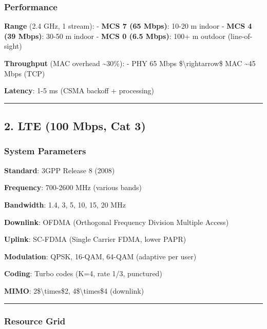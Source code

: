 \subsubsection{Performance}\label{performance}

\textbf{Range} (2.4 GHz, 1 stream): - \textbf{MCS 7 (65 Mbps)}: 10-20 m
indoor - \textbf{MCS 4 (39 Mbps)}: 30-50 m indoor - \textbf{MCS 0 (6.5
Mbps)}: 100+ m outdoor (line-of-sight)

\textbf{Throughput} (MAC overhead \textasciitilde30\%): - PHY 65 Mbps
\$\textbackslash rightarrow\$ MAC \textasciitilde45 Mbps (TCP)

\textbf{Latency}: 1-5 ms (CSMA backoff + processing)

\begin{center}\rule{0.5\linewidth}{0.5pt}\end{center}

\subsection{2. LTE (100 Mbps, Cat 3)}\label{lte-100-mbps-cat-3}

\subsubsection{System Parameters}\label{system-parameters-1}

\textbf{Standard}: 3GPP Release 8 (2008)

\textbf{Frequency}: 700-2600 MHz (various bands)

\textbf{Bandwidth}: 1.4, 3, 5, 10, 15, 20 MHz

\textbf{Downlink}: OFDMA (Orthogonal Frequency Division Multiple Access)

\textbf{Uplink}: SC-FDMA (Single Carrier FDMA, lower PAPR)

\textbf{Modulation}: QPSK, 16-QAM, 64-QAM (adaptive per user)

\textbf{Coding}: Turbo codes (K=4, rate 1/3, punctured)

\textbf{MIMO}: 2\$\textbackslash times\$2, 4\$\textbackslash times\$4
(downlink)

\begin{center}\rule{0.5\linewidth}{0.5pt}\end{center}

\subsubsection{Resource Grid}\label{resource-grid}

